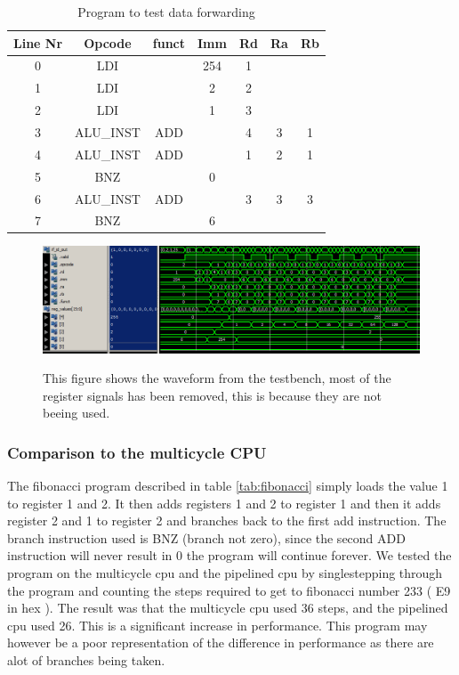 \documentclass[11pt]{report}
\begin{document}
\begin{table}[htbp]
  \centering
  \begin{tabular}{|c|c|c|c|c|c|c|}
    \hline
    Line Nr &	Opcode		&	funct	&	Imm	&	Rd	&	Ra	&	Rb	\\\hline
    	0	&	LDI			&			&	254	&	1	&		&		\\\hline
    	1	&	LDI			&			&	2	&	2	&		&		\\\hline
    	2	&	LDI			&			&	1	&	3	&		&		\\\hline
    	3	&	ALU\_INST	&	ADD		&		&	4	&	3	&	1	\\\hline
    	4	&	ALU\_INST	&	ADD		&		&	1	&	2	&	1	\\\hline
    	5	&	BNZ			&			&	0	&		&		&		\\\hline
    	6	&	ALU\_INST	&	ADD		&		&	3	&	3	&	3	\\\hline
    	7	&	BNZ			&			&	6	&		&		&		\\\hline

  \end{tabular}
  \caption{Program to test data forwarding}
  \label{tab:program3table}
\end{table}

\begin{figure}
  \centering
  \includegraphics[width=.95\linewidth]{test3.png} \\
  \caption{This figure shows the waveform from the testbench, 
  most of the register signals has been removed, this is because they are not beeing used.}
  \label{fig:program3wave}
\end{figure}

\subsubsection*{Comparison to the multicycle CPU}

The fibonacci program described in table \ref{tab:fibonacci} simply loads the value 1
to register 1 and 2. It then adds registers 1 and 2 to register 1 and then it adds
register 2 and 1 to register 2 and branches back to the first add instruction. The 
branch instruction used is BNZ (branch not zero), since the second ADD instruction
will never result in 0 the program will continue forever. We tested the program on
the multicycle cpu and the pipelined cpu by singlestepping through the program and
counting the steps required to get to fibonacci number 233 ( E9 in hex ). The result
was that the multicycle cpu used 36 steps, and the pipelined cpu used 26. This is a
significant increase in performance. This program may however be a poor representation
of the difference in performance as there are alot of branches being taken.
\end{document}
